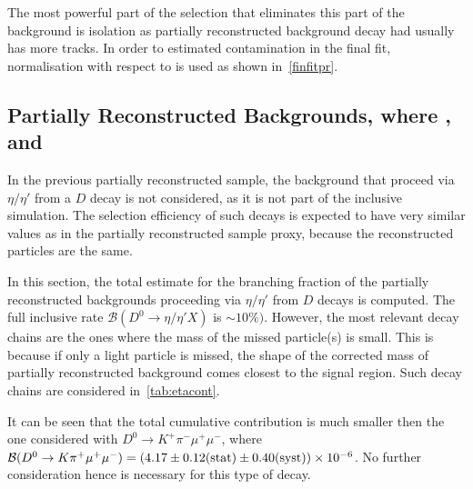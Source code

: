 The most powerful part of the selection that eliminates this part of the background is isolation as partially reconstructed background decay had usually has more tracks. In order to estimated contamination in the final fit, normalisation with respect to \bjpsimumuk is used as shown in~\autoref{finfitpr}.

\subsection{Partially Reconstructed Backgrounds, where , and }
\label{etasec}
In the previous partially reconstructed sample, the background that proceed via $\eta/\eta'$ from a $D$ decay is not considered, as it is not part of the inclusive simulation. The selection efficiency of such decays is expected to have very similar values as in the partially reconstructed sample proxy, because the reconstructed particles are the same.

In this section, the total estimate for the branching fraction of the partially reconstructed backgrounds proceeding via $\eta/\eta'$ from $D$ decays is computed. The full inclusive rate $\mathcal{B} (D^{0} \rightarrow \eta / \eta' X)$ is $ \sim 10 \%)$. However, the most relevant decay chains are the ones where the mass of the missed particle(s) is small. This is because if only a light particle is missed, the shape of the corrected mass of partially reconstructed background comes closest to the signal region. Such decay chains are considered in~\autoref{tab:etacont}.

It can be seen that the total cumulative contribution is much smaller then the one considered with $D^{0}\rightarrow K^{+} \pi^{-} \mu^{+} \mu^{-}$, where $\mathcal{B}(D^0 \rightarrow K \pi^+ \mu^{+} \mu^{-}) = (4.17\pm0.12 \rm{(stat)}\pm 0.40 \rm{(syst)})\times 10^{-6}$\cite{Aaij:2015hva}. No further consideration hence is necessary for this type of decay.

